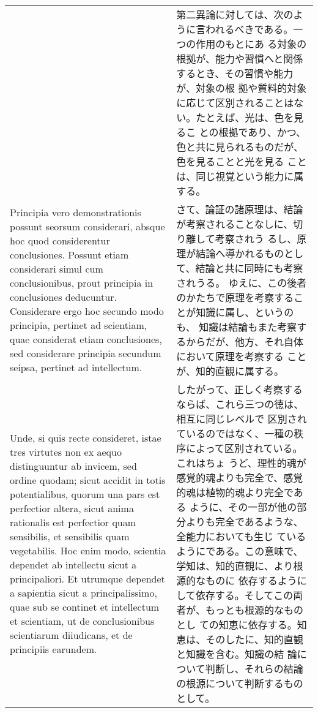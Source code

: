 \documentclass[10pt]{jsarticle}
\begin{document}
\begin{longtable}{p{21em}p{21em}}
&

第二異論に対しては、次のように言われるべきである。一つの作用のもとにあ
る対象の根拠が、能力や習慣へと関係するとき、その習慣や能力が、対象の根
拠や質料的対象に応じて区別されることはない。たとえば、光は、色を見るこ
との根拠であり、かつ、色と共に見られるものだが、色を見ることと光を見る
ことは、同じ視覚という能力に属する。

\\

Principia vero demonstrationis possunt seorsum considerari, absque hoc
quod considerentur conclusiones. Possunt etiam considerari simul cum
conclusionibus, prout principia in conclusiones
deducuntur. Considerare ergo hoc secundo modo principia, pertinet ad
scientiam, quae considerat etiam conclusiones, sed considerare
principia secundum seipsa, pertinet ad intellectum.

&

さて、論証の諸原理は、結論が考察されることなしに、切り離して考察されう
るし、原理が結論へ導かれるものとして、結論と共に同時にも考察されうる。
ゆえに、この後者のかたちで原理を考察することが知識に属し、というのも、
知識は結論もまた考察するからだが、他方、それ自体において原理を考察する
ことが、知的直観に属する。

\\

Unde, si quis recte consideret, istae tres virtutes non ex aequo
distinguuntur ab invicem, sed ordine quodam; sicut accidit in totis
potentialibus, quorum una pars est perfectior altera, sicut anima
rationalis est perfectior quam sensibilis, et sensibilis quam
vegetabilis. Hoc enim modo, scientia dependet ab intellectu sicut a
principaliori. Et utrumque dependet a sapientia sicut a
principalissimo, quae sub se continet et intellectum et scientiam, ut
de conclusionibus scientiarum diiudicans, et de principiis earundem.

&

したがって、正しく考察するならば、これら三つの徳は、相互に同じレベルで
区別されているのではなく、一種の秩序によって区別されている。これはちょ
うど、理性的魂が感覚的魂よりも完全で、感覚的魂は植物的魂より完全である
ように、その一部が他の部分よりも完全であるような、全能力においても生じ
ているようにである。この意味で、学知は、知的直観に、より根源的なものに
依存するようにして依存する。そしてこの両者が、もっとも根源的なものとし
ての知恵に依存する。知恵は、そのしたに、知的直観と知識を含む。知識の結
論について判断し、それらの結論の根源について判断するものとして。

\\


\end{longtable}
\end{document}
